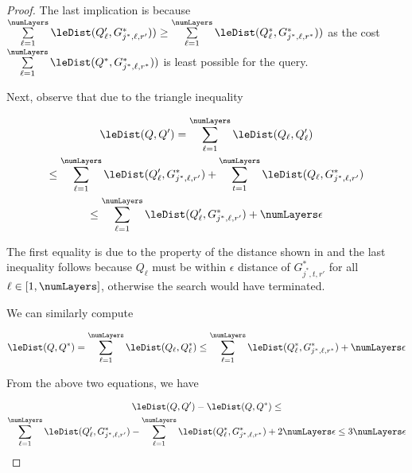 \documentclass[pdflatex,sn-mathphys-num]{sn-jnl}%
\theoremstyle{thmstyleone}%
\theoremstyle{thmstyletwo}%
\theoremstyle{thmstylethree}%
\begin{document}
\begin{appendices}
\begin{proof}
The last implication is because $\sum\limits_{\ell = 1}^{\numLayers} \leDist(\queryRetMat_\ell, G^{\ast}_{j^{*}, \ell, r'})) \ge  \sum\limits_{\ell = 1}^{\numLayers} \leDist(\optMat_\ell, G^{\ast}_{j^{*}, \ell, r^{\ast}}))$ as the cost $\sum\limits_{\ell = 1}^{\numLayers}\leDist(\optMat, G^{\ast}_{j^{*}, \ell, r^{\ast}}))$ is least possible for the query. 





Next, observe that due to the triangle inequality

\begin{multline*}
   \leDist(\queryMat, \queryRetMat) = 
   \sum\limits_{\ell = 1}^{\numLayers} \leDist(\queryMat_\ell, \queryRetMat_\ell) \\
     \le \sum\limits_{\ell = 1}^{\numLayers} \leDist(\queryRetMat_\ell, G^{\ast}_{j^{*}, \ell, r'}) 
    +  \sum\limits_{t = 1}^{\numLayers} \leDist(\queryMat_\ell,G^{\ast}_{j^{*}, \ell, r'} ) \\
    \le   \sum\limits_{\ell = 1}^{\numLayers} \leDist(\queryRetMat_\ell, G^{\ast}_{j^{*}, \ell, r'}) + \numLayers \epsilon
\end{multline*}

The first equality is due to the property of the \logEuclid distance shown in  and the last inequality follows because $Q_\ell$ must be within $\epsilon$ distance of $G^{\ast}_{j^{*}, t, r'}$ for all $\ell \in [1, \numLayers]$, otherwise the search would have terminated. 

We can similarly compute 

\begin{multline*}
    \leDist(\queryMat, \optMat) = \sum\limits_{\ell = 1}^{\numLayers} \leDist(\queryMat_\ell, \optMat_\ell) \le 
      \sum\limits_{\ell = 1}^{\numLayers} \leDist(\optMat_\ell, G^{\ast}_{j^{*}, \ell, r^{\ast}}) + \numLayers \epsilon
\end{multline*}

From the above two equations, we have 

\begin{multline*}
    \leDist(\queryMat, \queryRetMat) -  \leDist(\queryMat, \optMat)  \le \\
    \sum\limits_{\ell = 1}^{\numLayers} \leDist(\queryRetMat_\ell, G^{\ast}_{j^{*}, \ell, r'}) - \sum\limits_{\ell = 1}^{\numLayers} \leDist(\optMat_\ell, G^{\ast}_{j^{*}, \ell, r^{\ast}}) + 2 \numLayers \epsilon 
    \le 3\numLayers\epsilon
\end{multline*}
\end{proof}
\clearpage

\end{appendices}
\end{document}
